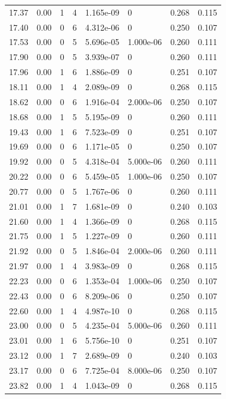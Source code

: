 \documentclass[preview]{standalone}
\begin{document}
{{{\begin{tabular}{L{1.2cm}C{1.2cm} C{0.3cm}C{0.5cm} C{1.4cm}C{1.4cm} C{1.4cm}C{1.4cm}}
  17.37  &  0.00  & 1     &  4 &  1.165e-09  & 0  & 0.268 &  0.115   \\ 
  17.40  &  0.00  & 0     &  6 &  4.312e-06  & 0  & 0.250 &  0.107   \\ 
  17.53  &  0.00  & 0     &  5 &  5.696e-05  & 1.000e-06  & 0.260 &  0.111   \\ 
  17.90  &  0.00  & 0     &  5 &  3.939e-07  & 0  & 0.260 &  0.111   \\ 
  17.96  &  0.00  & 1     &  6 &  1.886e-09  & 0  & 0.251 &  0.107   \\ 
  18.11  &  0.00  & 1     &  4 &  2.089e-09  & 0  & 0.268 &  0.115   \\ 
  18.62  &  0.00  & 0     &  6 &  1.916e-04  & 2.000e-06  & 0.250 &  0.107   \\ 
  18.68  &  0.00  & 1     &  5 &  5.195e-09  & 0  & 0.260 &  0.111   \\ 
  19.43  &  0.00  & 1     &  6 &  7.523e-09  & 0  & 0.251 &  0.107   \\ 
  19.69  &  0.00  & 0     &  6 &  1.171e-05  & 0  & 0.250 &  0.107   \\ 
  19.92  &  0.00  & 0     &  5 &  4.318e-04  & 5.000e-06  & 0.260 &  0.111   \\ 
  20.22  &  0.00  & 0     &  6 &  5.459e-05  & 1.000e-06  & 0.250 &  0.107   \\ 
  20.77  &  0.00  & 0     &  5 &  1.767e-06  & 0  & 0.260 &  0.111   \\ 
  21.01  &  0.00  & 1     &  7 &  1.681e-09  & 0  & 0.240 &  0.103   \\ 
  21.60  &  0.00  & 1     &  4 &  1.366e-09  & 0  & 0.268 &  0.115   \\ 
  21.75  &  0.00  & 1     &  5 &  1.227e-09  & 0  & 0.260 &  0.111   \\ 
  21.92  &  0.00  & 0     &  5 &  1.846e-04  & 2.000e-06  & 0.260 &  0.111   \\ 
  21.97  &  0.00  & 1     &  4 &  3.983e-09  & 0  & 0.268 &  0.115   \\ 
  22.23  &  0.00  & 0     &  6 &  1.353e-04  & 1.000e-06  & 0.250 &  0.107   \\ 
  22.43  &  0.00  & 0     &  6 &  8.209e-06  & 0  & 0.250 &  0.107   \\ 
  22.60  &  0.00  & 1     &  4 &  4.987e-10  & 0  & 0.268 &  0.115   \\ 
  23.00  &  0.00  & 0     &  5 &  4.235e-04  & 5.000e-06  & 0.260 &  0.111   \\ 
  23.01  &  0.00  & 1     &  6 &  5.756e-10  & 0  & 0.251 &  0.107   \\ 
  23.12  &  0.00  & 1     &  7 &  2.689e-09  & 0  & 0.240 &  0.103   \\ 
  23.17  &  0.00  & 0     &  6 &  7.725e-04  & 8.000e-06  & 0.250 &  0.107   \\ 
  23.82  &  0.00  & 1     &  4 &  1.043e-09  & 0  & 0.268 &  0.115   \\ 
\hline 
\end{tabular} 

}}}
\end{document}
